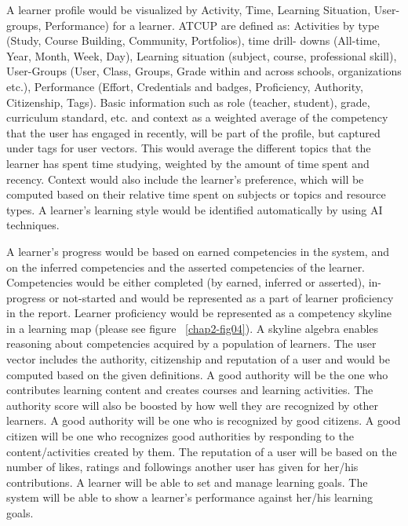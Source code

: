 \begin{multicols}{2}
A learner profile would be visualized by Activity, Time, Learning Situation, User-groups, Performance) for a learner. ATCUP are defined as: Activities by type (Study, Course Building, Community, Portfolios), time drill- downs (All-time, Year, Month, Week, Day), Learning situation (subject, course, professional skill), User-Groups (User, Class, Groups, Grade within and across schools, organizations etc.), Performance (Effort, Credentials and badges, Proficiency, Authority, Citizenship, Tags). Basic information such as role (teacher, student), grade, curriculum standard, etc. and context as a weighted average of the competency that the user has engaged in recently, will be part of the profile, but captured under tags for user vectors. This would average the different topics that the learner has spent time studying, weighted by the amount of time spent and recency. Context would also include the learner’s preference, which will be computed based on their relative time spent on subjects or topics and resource types. A learner’s learning style would be identified automatically by using AI techniques.

A learner’s progress would be based on earned competencies in the system, and on the inferred competencies and the asserted competencies of the learner. Competencies would be either completed (by earned, inferred or asserted), in-progress or not-started and would be represented as a part of learner proficiency in the report. Learner proficiency would be represented as a competency skyline in a learning map (please see figure ~\ref{chap2-fig04}). A skyline algebra enables reasoning about competencies acquired by a population of learners. The user vector includes the authority, citizenship and reputation of a user and would be computed based on the given definitions. A good authority will be the one who contributes learning content and creates courses and learning activities. The authority score will also be boosted by how well they are recognized by other learners. A good authority will be one who is recognized by good citizens. A good citizen will be one who recognizes good authorities by responding to the content/activities created by them. The reputation of a user will be based on the number of likes, ratings and followings another user has given for her/his contributions. A learner will be able to set and manage learning goals. The system will be able to show a learner’s performance against her/his learning goals.


\end{multicols}
